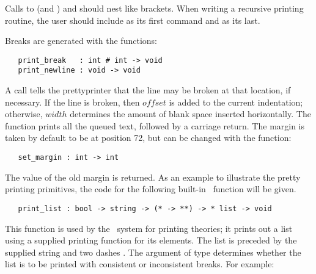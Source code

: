\noindent Calls to  (and ) and
 should nest like brackets. When writing a recursive printing 
routine, the user should include  as its first command and 
 as its last. 

Breaks are generated with the functions:


\begin{boxed}
\begin{verbatim}
   print_break   : int # int -> void
   print_newline : void -> void
\end{verbatim}\end{boxed}

\noindent A call  
tells the prettyprinter that the line may be 
broken at that location, 
if necessary. If the line is broken, then $offset$ is added to the
current indentation; otherwise, $width$ determines the amount of blank space
inserted horizontally. The function  
prints all the queued text, followed
by a carriage return. 
The margin is taken by default to be at position 72, but can be changed with the
function:

\begin{boxed}
\begin{verbatim}
   set_margin : int -> int
\end{verbatim}\end{boxed}

\noindent The value of the 
old margin is returned. As an example to illustrate the pretty
printing primitives, the code for the following built-in \ML\ function will be
given.

\begin{boxed}
\begin{verbatim}
   print_list : bool -> string -> (* -> **) -> * list -> void
\end{verbatim}\end{boxed}

\noindent This function is used by the \HOL\ system for printing theories; it
prints out a list using a supplied printing function for its elements. The list is
preceded by the supplied string and two dashes \ml{--}.  The argument of type
 determines whether the list is to be printed with consistent or
inconsistent breaks. For example:

